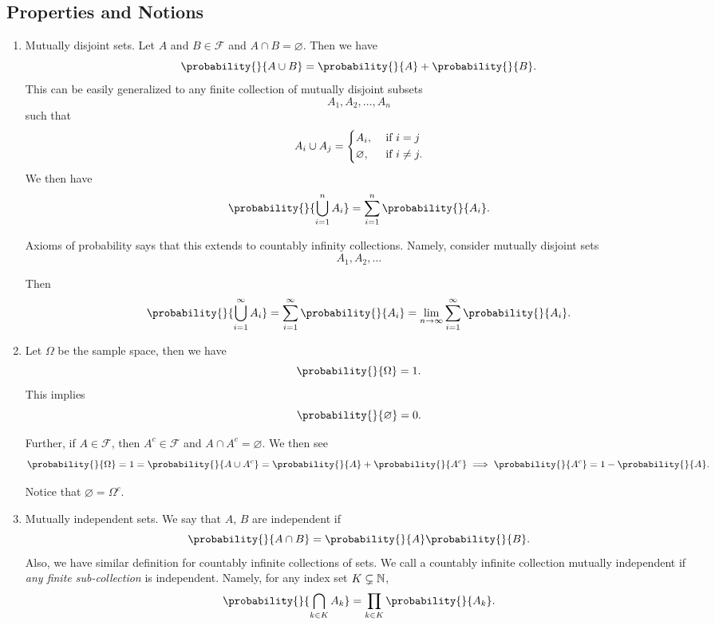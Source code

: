 \subsection{Properties and Notions}
\begin{enumerate}
	\item Mutually disjoint sets. Let \(A\) and \(B\in\mathcal{F}\) and \(A\cap B = \varnothing\). Then we have
	      \[
		      \probability{}{A\cup B} = \probability{}{A} + \probability{}{B}.
	      \]
	      This can be easily generalized to any finite collection of mutually disjoint subsets
	      \[
		      A_1, A_2, \ldots , A_n
	      \]
	      such that
	      \[
		      A_i \cup A_j = \begin{dcases}
			      A_i,         & \text{ if }i = j    \\
			      \varnothing, & \text{ if }i\neq j.
		      \end{dcases}
	      \]
	      We then have \[
		      \probability{}{\bigcup\limits_{i = 1}^n A_{i}} = \sum\limits_{i=1}^{n} \probability{}{A_{i}}.
	      \]
	      \begin{remark}
		      Axioms of probability says that this extends to countably infinity collections. Namely, consider mutually disjoint sets
		      \[
			      A_1, A_2, \ldots
		      \]

		      Then
		      \[
			      \probability{}{\bigcup\limits_{i=1}^{\infty} A_{i}} = \sum\limits_{i=1}^{\infty} \probability{}{A_{i}} = \lim_{n \to \infty} \sum\limits_{i=1}^{\infty} \probability{}{A_{i}}.
		      \]
	      \end{remark}
	\item Let \(\Omega\) be the sample space, then we have
	      \[
		      \probability{}{\Omega} = 1.
	      \]
	      This implies
	      \[
		      \probability{}{\varnothing } = 0.
	      \]

	      Further, if \(A\in\mathcal{F}\), then \(A^{c}\in\mathcal{F}\) and \(A\cap A^{c}= \varnothing \). We then see
	      \[
		      \probability{}{\Omega} = 1 = \probability{}{A\cup A^{c}} = \probability{}{A} + \probability{}{A^{c}} \implies \probability{}{A^{c}} = 1 - \probability{}{A}.
	      \]

	      Notice that \(\varnothing  = \Omega^{c}\).
	\item Mutually independent sets. We say that \(A\), \(B\) are independent if
	      \[
		      \probability{}{A\cap B} = \probability{}{A}\probability{}{B}.
	      \]
	      Also, we have similar definition for countably infinite collections of sets. We call a countably infinite collection mutually independent if \emph{any finite sub-collection}
	      is independent. Namely, for any index set \(K\subsetneq \mathbb{\MakeUppercase{N}}\),
	      \[
		      \probability{}{\bigcap\limits_{k\in K} A_k } = \prod_{k\in K} \probability{}{A_k}.
	      \]
\end{enumerate}

